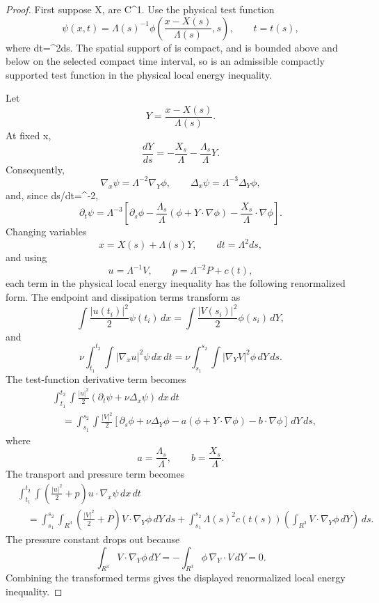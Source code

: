 \documentclass[11pt]{amsart}
\def\({}%
\def\){}%
\def\mathbb#1{#1}%
\theoremstyle{plain}
\theoremstyle{definition}
\theoremstyle{remark}
\begin{document}
\begin{proof}
First suppose \(X,\Lambda\) are \(C^1\).  Use the physical test function
\[
  \psi(x,t)=\Lambda(s)^{-1}
  \phi\left(\frac{x-X(s)}{\Lambda(s)},s\right),
  \qquad t=t(s),
\]
where \(dt=\Lambda^2ds\).  The spatial support of \(\phi\) is compact, and
\(\Lambda\) is bounded above and below on the selected compact time interval,
so \(\psi\) is an admissible compactly supported test function in the physical
local energy inequality.

Let
\[
  Y=\frac{x-X(s)}{\Lambda(s)}.
\]
At fixed \(x\),
\[
  \frac{dY}{ds}
  =
  -\frac{X_s}{\Lambda}-\frac{\Lambda_s}{\Lambda}Y .
\]
Consequently,
\[
  \nabla_x\psi=\Lambda^{-2}\nabla_Y\phi,\qquad
  \Delta_x\psi=\Lambda^{-3}\Delta_Y\phi,
\]
and, since \(ds/dt=\Lambda^{-2}\),
\[
  \partial_t\psi
  =
  \Lambda^{-3}
  \left[
  \partial_s\phi
  -\frac{\Lambda_s}{\Lambda}(\phi+Y\cdot\nabla\phi)
  -\frac{X_s}{\Lambda}\cdot\nabla\phi
  \right].
\]
Changing variables
\[
  x=X(s)+\Lambda(s)Y,\qquad dt=\Lambda^2ds,
\]
and using
\[
  u=\Lambda^{-1}V,\qquad p=\Lambda^{-2}P+c(t),
\]
each term in the physical local energy inequality has the following
renormalized form.  The endpoint and dissipation terms transform as
\[
  \int \frac{|u(t_i)|^2}{2}\psi(t_i)\,dx
  =
  \int \frac{|V(s_i)|^2}{2}\phi(s_i)\,dY,
\]
and
\[
  \nu\int_{t_1}^{t_2}\int |\nabla_xu|^2\psi\,dx\,dt
  =
  \nu\int_{s_1}^{s_2}\int |\nabla_YV|^2\phi\,dY\,ds.
\]
The test-function derivative term becomes
\[
\begin{aligned}
&\int_{t_1}^{t_2}\int \frac{|u|^2}{2}
(\partial_t\psi+\nu\Delta_x\psi)\,dx\,dt\\
&\quad =
\int_{s_1}^{s_2}\int \frac{|V|^2}{2}
\left[
\partial_s\phi+\nu\Delta_Y\phi
-a(\phi+Y\cdot\nabla\phi)-b\cdot\nabla\phi
\right]\,dY\,ds,
\end{aligned}
\]
where
\[
  a=\frac{\Lambda_s}{\Lambda},
  \qquad
  b=\frac{X_s}{\Lambda}.
\]
The transport and pressure term becomes
\[
\begin{aligned}
&\int_{t_1}^{t_2}\int
\left(\frac{|u|^2}{2}+p\right)u\cdot\nabla_x\psi\,dx\,dt\\
&\quad =
\int_{s_1}^{s_2}\int_{\mathbb R^3}
\left(\frac{|V|^2}{2}+P\right)V\cdot\nabla_Y\phi\,dY\,ds
{}+\int_{s_1}^{s_2}\Lambda(s)^2c(t(s))
\left(\int_{\mathbb R^3} V\cdot\nabla_Y\phi\,dY\right)\,ds .
\end{aligned}
\]
The pressure constant drops out
because
\[
  \int_{\mathbb R^3} V\cdot\nabla_Y\phi\,dY
  =
  -\int_{\mathbb R^3} \phi\,\nabla_Y\cdot V\,dY=0.
\]
Combining the transformed terms gives the displayed renormalized local energy
inequality.


\end{proof}
\end{document}
